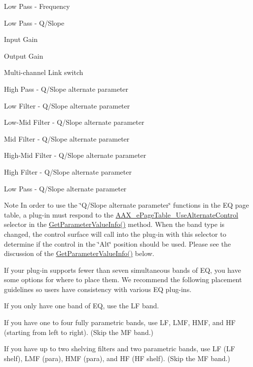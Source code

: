 \begin{DoxyItemize}
\begin{DoxyEnumerate}
\item Low Pass -\/ Frequency  
\item Low Pass -\/ Q/\+Slope  
\item Input Gain  
\item Output Gain  
\item Multi-\/channel Link switch  
\item High Pass -\/ Q/\+Slope alternate parameter  
\item Low Filter -\/ Q/\+Slope alternate parameter  
\item Low-\/\+Mid Filter -\/ Q/\+Slope alternate parameter  
\item Mid Filter -\/ Q/\+Slope alternate parameter  
\item High-\/\+Mid Filter -\/ Q/\+Slope alternate parameter  
\item High Filter -\/ Q/\+Slope alternate parameter  
\item Low Pass -\/ Q/\+Slope alternate parameter  
\end{DoxyEnumerate}
\end{DoxyItemize}

\begin{DoxyNote}{Note}
In order to use the \char`\"{}\+Q/\+Slope alternate parameter\char`\"{} functions in the EQ page table, a plug-\/in must respond to the \mbox{\hyperlink{a00491_aa169208a2ce713fa021e20deb2eaf608a1a0d975a333d3aee81b22f878697e9c4}{A\+A\+X\+\_\+e\+Page\+Table\+\_\+\+Use\+Alternate\+Control}} selector in the \mbox{\hyperlink{a01481_a0d3436cb88b4a86fe82a663221a9cfef}{Get\+Parameter\+Value\+Info()}} method. When the band type is changed, the control surface will call into the plug-\/in with this selector to determine if the control in the \char`\"{}\+Alt\char`\"{} position should be used. Please see the discussion of the \mbox{\hyperlink{a01481_a0d3436cb88b4a86fe82a663221a9cfef}{Get\+Parameter\+Value\+Info()}} below.
\end{DoxyNote}
If your plug-\/in supports fewer than seven simultaneous bands of EQ, you have some options for where to place them. We recommend the following placement guidelines so users have consistency with various EQ plug-\/ins. 
\begin{DoxyItemize}
\item If you only have one band of EQ, use the LF band.  
\item If you have one to four fully parametric bands, use LF, L\+MF, H\+MF, and HF (starting from left to right). (Skip the MF band.)  
\item If you have up to two shelving filters and two parametric bands, use LF (LF shelf), L\+MF (para), H\+MF (para), and HF (HF shelf). (Skip the MF band.)   
\end{DoxyItemize}

